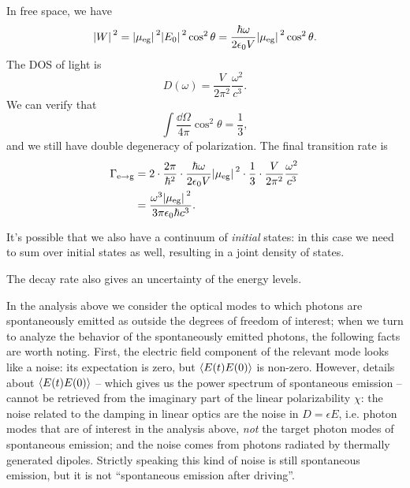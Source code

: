 \documentclass[hyperref, a4paper]{article}
\begin{document}
In free space, we have 
\begin{equation}
    \abs*{W}^2 = \abs*{\mu_{\text{eg}}}^2 \abs*{E_0}^2 \cos^2 \theta
    = \frac{\hbar \omega}{2 \epsilon_0 V} \abs*{\mu_{\text{eg}}}^2 \cos^2 \theta.
\end{equation}
The DOS of light is 
\begin{equation}
    D(\omega) = \frac{V}{2 \pi^2} \frac{\omega^2}{c^3}.
    \label{eq:dos-free-space}
\end{equation}
We can verify that 
\begin{equation}
    \int \frac{\dd{\Omega}}{4\pi} \cos^2 \theta = \frac{1}{3},
\end{equation}
and we still have double degeneracy of polarization.
The final transition rate is 
\begin{equation}
    \begin{aligned}
        \Gamma_{\text{e} \to \text{g}} &= 
        2 \cdot \frac{2\pi}{\hbar^2} \cdot \frac{\hbar \omega}{2 \epsilon_0 V} \abs*{\mu_{\text{eg}}}^2 \cdot \frac{1}{3} \cdot \frac{V}{2 \pi^2} \frac{\omega^2}{c^3} \\
        &= \frac{
            \omega^3 \abs*{\mu_{\text{eg}}}^2
        }{
            3 \pi \epsilon_0 \hbar c^3
        }.
    \end{aligned}
\end{equation}

It's possible that we also have a continuum of \emph{initial} states:
in this case we need to sum over initial states as well,
resulting in a joint density of states. 

The decay rate also gives an uncertainty of the energy levels.

In the analysis above we consider the optical modes 
to which photons are spontaneously emitted 
as outside the degrees of freedom of interest; 
when we turn to analyze the behavior of the spontaneously emitted photons, 
the following facts are worth noting.
First, the electric field component of the relevant mode 
looks like a noise: its expectation is zero, 
but $\expval{E(t) E(0)}$ is non-zero.
However, details about $\expval{E(t) E(0)}$ 
-- which gives us the power spectrum of spontaneous emission -- 
cannot be retrieved from the imaginary part of the linear polarizability $\chi$: 
the noise related to the damping in linear optics 
are the noise in $D = \epsilon E$, 
i.e. photon modes that are of interest in the analysis above, 
\emph{not} the target photon modes of spontaneous emission; 
and the noise comes from photons radiated by thermally generated dipoles.
Strictly speaking this kind of noise is still spontaneous emission, 
but it is not ``spontaneous emission after driving''.
\end{document}
